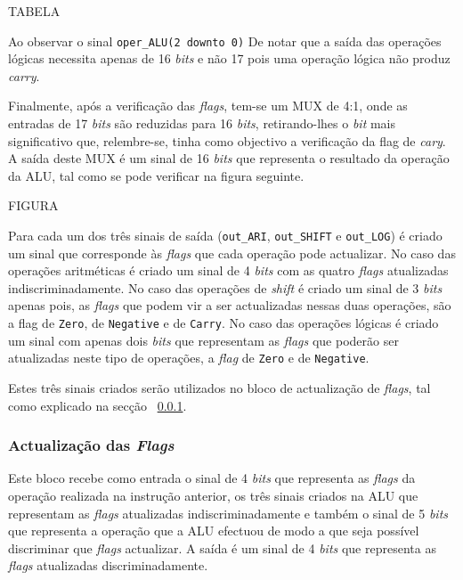 \documentclass[11pt]{article}
\numberwithin{equation}{section}
\begin{document}
TABELA

Ao observar o sinal \texttt{oper\_ALU(2 {\footnotesize downto} 0)}
De notar que a saída das operações lógicas necessita apenas de 16 \textit{bits} e não 17 pois uma operação lógica não produz \textit{carry}.

Finalmente, após a verificação das \textit{flags}, tem-se um MUX de 4:1, onde as entradas de 17 \textit{bits} são reduzidas para 16 \textit{bits}, retirando-lhes o \textit{bit} mais significativo que, relembre-se, tinha como objectivo a verificação da flag de \textit{cary}. A saída deste MUX é um sinal de 16 \textit{bits} que representa o resultado da operação da ALU, tal como se pode verificar na figura seguinte.

FIGURA

Para cada um dos três sinais de saída (\texttt{out\_ARI}, \texttt{out\_SHIFT} e \texttt{out\_LOG}) é criado um sinal que corresponde às \textit{flags} que cada operação pode actualizar. No caso das operações aritméticas é criado um sinal de 4 \textit{bits} com as quatro \textit{flags} atualizadas indiscriminadamente. No caso das operações de \textit{shift} é criado um sinal de 3 \textit{bits} apenas pois, as \textit{flags} que podem vir a ser actualizadas nessas duas operações, são a flag de \texttt{Zero}, de \texttt{Negative} e de \texttt{Carry}. No caso das operações lógicas é criado um sinal com apenas dois \textit{bits} que representam as \textit{flags} que poderão ser atualizadas neste tipo de operações, a \textit{flag} de \texttt{Zero} e de \texttt{Negative}.

Estes três sinais criados serão utilizados no bloco de actualização de \textit{flags}, tal como explicado na secção ~\ref{subsec:act-flags}.

\subsubsection{Actualização das \textit{Flags}}
\label{subsec:act-flags}

Este bloco recebe como entrada o sinal de 4 \textit{bits} que representa as \textit{flags} da operação realizada na instrução anterior, os três sinais criados na ALU que representam as \textit{flags} atualizadas indiscriminadamente e também o sinal de 5 \textit{bits} que representa a operação que a ALU efectuou de modo a que seja possível discriminar que \textit{flags} actualizar. A saída é um sinal de 4 \textit{bits} que representa as \textit{flags} atualizadas discriminadamente.
\end{document}
